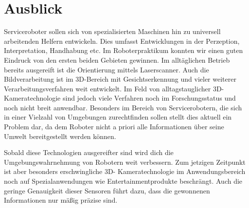 \section{Ausblick}
Serviceroboter sollen sich von spezialisierten Maschinen hin zu universell arbeitenden Helfern entwickeln.
 Dies umfasst Entwicklungen in der Perzeption, Interpretation, Handhabung etc. Im Roboterpraktikum konnten wir einen guten Eindruck von den ersten beiden Gebieten gewinnen.
 Im alltäglichen Betrieb bereits ausgereift ist die Orientierung mittels
 Laserscanner. Auch die Bildverarbeitung ist im 3D-Bereich mit Gesichtserkennung
 und vieler weiterer Verarbeitungsverfahren weit entwickelt. Im Feld von alltagstauglicher 3D-Kameratechnologie sind jedoch viele Verfahren noch im Forschungsstatus
 und noch nicht breit anwendbar. Besonders im Bereich von Servicerobotern, die sich in einer Vielzahl von Umgebungen zurechtfinden sollen stellt dies aktuell ein Problem dar,
 da dem Roboter nicht a priori alle Informationen über seine Umwelt bereitgestellt werden können.
 
Sobald diese Technologien ausgereifter sind wird dich die Umgebungswahrnehmung von Robotern weit verbessern.
 Zum jetzigen Zeitpunkt ist aber besonders erschwingliche 3D- Kameratechnologie im Anwendungsbereich noch auf Spezialanwendungen wie Entertainmentprodukte beschrängt.
 Auch die geringe Genauigkeit dieser Sensoren führt dazu, dass die gewonnenen Informationen nur mäßig präzise sind.